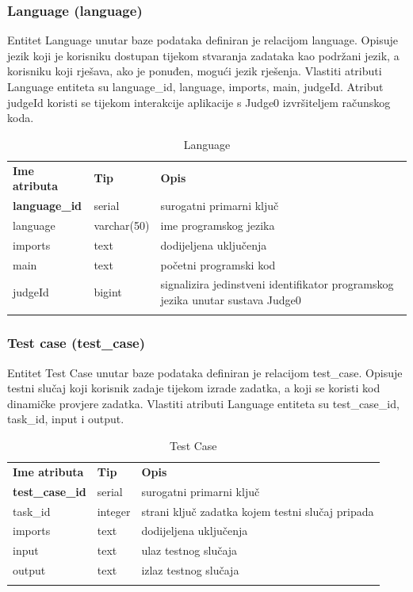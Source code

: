 \documentclass[times, utf8, zavrsni]{fer}
\begin{document}
		\subsubsection{Language (language)}
		Entitet Language unutar baze podataka definiran je relacijom language. Opisuje jezik koji je korisniku dostupan tijekom stvaranja zadataka kao podržani jezik, a korisniku koji rješava, ako je ponuđen, mogući jezik rješenja. Vlastiti atributi Language entiteta su language\_id, language, imports, main, judgeId. Atribut judgeId koristi se tijekom interakcije aplikacije s Judge0 izvršiteljem računskog koda. 
		\begin{table}[H]
			\caption{Language}
			\label{tbl:language}
			\centering
			\begin{tabu} to \textwidth {XXX}
				\tabucline[1.75pt]{-}
				\textbf{Ime atributa} & \textbf{Tip} & \textbf{Opis}\\ 				
				\tabucline[1pt]{-}
				\textbf{language\_id} & serial & surogatni primarni ključ\\ \hline
				language & varchar(50) & ime programskog jezika\\ \hline
				imports & text & dodijeljena uključenja\\ \hline
				main & text & početni programski kod\\ \hline
				judgeId & bigint & signalizira jedinstveni identifikator programskog jezika unutar sustava Judge0\\ \hline
				\tabucline[1.75pt]{-}
			\end{tabu}
		\end{table}
	
		\subsubsection{Test case (test\_case)}
		Entitet Test Case unutar baze podataka definiran je relacijom test\_case. Opisuje testni slučaj koji korisnik zadaje tijekom izrade zadatka, a koji se koristi kod dinamičke provjere zadatka. Vlastiti atributi Language entiteta su test\_case\_id, task\_id, input i output. 
		\begin{table}[H]
			\caption{Test Case}
			\label{tbl:testcase}
			\centering
			\begin{tabu} to \textwidth {XXX}
				\tabucline[1.75pt]{-}
				\textbf{Ime atributa} & \textbf{Tip} & \textbf{Opis}\\ 				
				\tabucline[1pt]{-}
				\textbf{test\_case\_id} & serial & surogatni primarni ključ\\ \hline
				task\_id & integer & strani ključ zadatka kojem testni slučaj pripada\\ \hline
				imports & text & dodijeljena uključenja\\ \hline
				input & text & ulaz testnog slučaja\\ \hline
				output & text & izlaz testnog slučaja\\ \hline
				\tabucline[1.75pt]{-}
			\end{tabu}
		\end{table}
		
\end{document}
